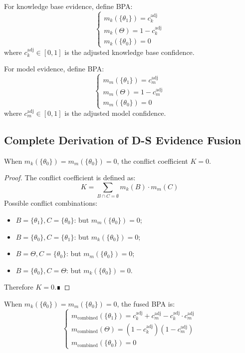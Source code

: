 \documentclass[11pt,a4paper]{report}
\begin{document}
For knowledge base evidence, define BPA:
\[
\begin{cases}
m_k(\{\theta_1\}) = c_k^{\text{adj}} \\
m_k(\Theta) = 1 - c_k^{\text{adj}} \\
m_k(\{\theta_0\}) = 0
\end{cases}
\]
where $c_k^{\text{adj}} \in [0,1]$ is the adjusted knowledge base confidence.

For model evidence, define BPA:
\[
\begin{cases}
m_m(\{\theta_1\}) = c_m^{\text{adj}} \\
m_m(\Theta) = 1 - c_m^{\text{adj}} \\
m_m(\{\theta_0\}) = 0
\end{cases}
\]
where $c_m^{\text{adj}} \in [0,1]$ is the adjusted model confidence.

\subsection{Complete Derivation of D-S Evidence Fusion}

\begin{theorem}
When $m_k(\{\theta_0\}) = m_m(\{\theta_0\}) = 0$, the conflict coefficient $K=0$.
\end{theorem}

\begin{proof}
The conflict coefficient is defined as:
\[
K = \sum_{B \cap C = \emptyset} m_k(B) \cdot m_m(C)
\]
Possible conflict combinations:
\begin{itemize}
    \item $B = \{\theta_1\}, C = \{\theta_0\}$: but $m_m(\{\theta_0\}) = 0$;
    \item $B = \{\theta_0\}, C = \{\theta_1\}$: but $m_k(\{\theta_0\}) = 0$;
    \item $B = \Theta, C = \{\theta_0\}$: but $m_m(\{\theta_0\}) = 0$;
    \item $B = \{\theta_0\}, C = \Theta$: but $m_k(\{\theta_0\}) = 0$.
\end{itemize}
Therefore $K = 0$.∎
\end{proof}

\begin{theorem}
When $m_k(\{\theta_0\}) = m_m(\{\theta_0\}) = 0$, the fused BPA is:
\[
\begin{cases}
m_{\text{combined}}(\{\theta_1\}) = c_k^{\text{adj}} + c_m^{\text{adj}} - c_k^{\text{adj}} \cdot c_m^{\text{adj}} \\
m_{\text{combined}}(\Theta) = (1 - c_k^{\text{adj}})(1 - c_m^{\text{adj}}) \\
m_{\text{combined}}(\{\theta_0\}) = 0
\end{cases}
\]
\end{theorem}
\end{document}
